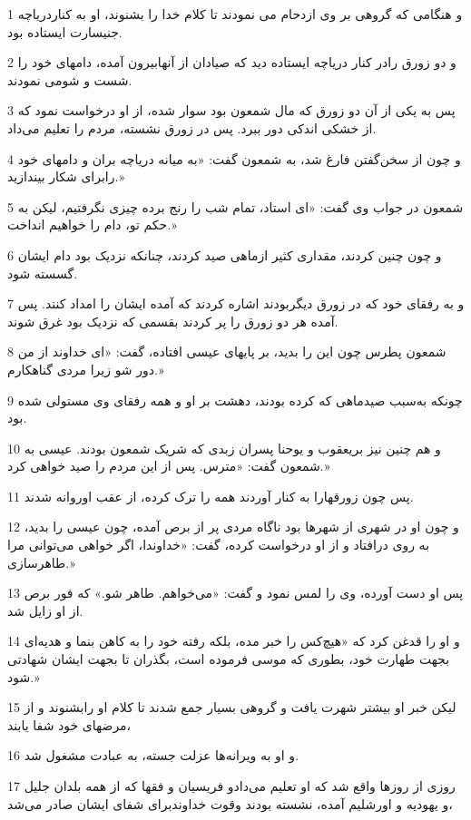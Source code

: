 \par 1 و هنگامی که گروهی بر وی ازدحام می نمودند تا کلام خدا را بشنوند، او به کناردریاچه جنیسارت ایستاده بود.
\par 2 و دو زورق رادر کنار دریاچه ایستاده دید که صیادان از آنهابیرون آمده، دامهای خود را شست و شومی نمودند.
\par 3 پس به یکی از آن دو زورق که مال شمعون بود سوار شده، از او درخواست نمود که از خشکی اندکی دور ببرد. پس در زورق نشسته، مردم را تعلیم می‌داد.
\par 4 و چون از سخن‌گفتن فارغ شد، به شمعون گفت: «به میانه دریاچه بران و دامهای خود رابرای شکار بیندازید.»
\par 5 شمعون در جواب وی گفت: «ای استاد، تمام شب را رنج برده چیزی نگرفتیم، لیکن به حکم تو، دام را خواهیم انداخت.»
\par 6 و چون چنین کردند، مقداری کثیر ازماهی صید کردند، چنانکه نزدیک بود دام ایشان گسسته شود.
\par 7 و به رفقای خود که در زورق دیگربودند اشاره کردند که آمده ایشان را امداد کنند. پس آمده هر دو زورق را پر کردند بقسمی که نزدیک بود غرق شوند.
\par 8 شمعون پطرس چون این را بدید، بر پایهای عیسی افتاده، گفت: «ای خداوند از من دور شو زیرا مردی گناهکارم.»
\par 9 چونکه به‌سبب صیدماهی که کرده بودند، دهشت بر او و همه رفقای وی مستولی شده بود.
\par 10 و هم چنین نیز بریعقوب و یوحنا پسران زبدی که شریک شمعون بودند. عیسی به شمعون گفت: «مترس. پس از این مردم را صید خواهی کرد.»
\par 11 پس چون زورقهارا به کنار آوردند همه را ترک کرده، از عقب اوروانه شدند.
\par 12 و چون او در شهری از شهرها بود ناگاه مردی پر از برص آمده، چون عیسی را بدید، به روی در‌افتاد و از او درخواست کرده، گفت: «خداوندا، اگر خواهی می‌توانی مرا طاهرسازی.»
\par 13 پس او دست آورده، وی را لمس نمود و گفت: «می‌خواهم. طاهر شو.» که فور برص از او زایل شد.
\par 14 و او را قدغن کرد که «هیچ‌کس را خبر مده، بلکه رفته خود را به کاهن بنما و هدیه‌ای بجهت طهارت خود، بطوری که موسی فرموده است، بگذران تا بجهت ایشان شهادتی شود.»
\par 15 لیکن خبر او بیشتر شهرت یافت و گروهی بسیار جمع شدند تا کلام او رابشنوند و از مرضهای خود شفا یابند،
\par 16 و او به ویرانه‌ها عزلت جسته، به عبادت مشغول شد.
\par 17 روزی از روزها واقع شد که او تعلیم می‌دادو فریسیان و فقها که از همه بلدان جلیل و یهودیه و اورشلیم آمده، نشسته بودند وقوت خداوندبرای شفای ایشان صادر می‌شد،
